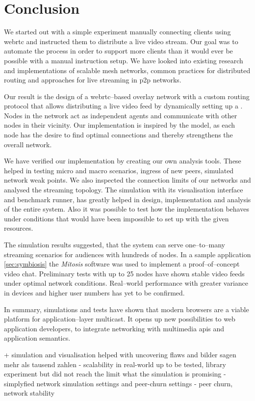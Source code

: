 \section{Conclusion}
We started out with a simple experiment manually connecting clients using \gls{webrtc} and instructed them to distribute a live video stream.
Our goal was to automate the process in order to support more clients than it would ever be possible with a manual instruction setup.
We have looked into existing research and implementations of scalable mesh networks, common practices for distributed routing and approaches for live streaming in \gls{p2p} networks.

Our result is the design of a \gls{webrtc}–based overlay network with a custom routing protocol that allows distributing a live video feed by dynamically setting up a . Nodes in the network act as independent agents and communicate with other nodes in their vicinity. Our implementation is inspired by the  model, as each node has the desire to find optimal connections and thereby strengthens the overall network.

We have verified our implementation by creating our own analysis tools. These helped in testing micro and macro scenarios, ingress of new peers, simulated network weak points. We also inspected the connection limits of our networks and analysed the streaming topology. The simulation with its visualisation interface and benchmark runner, has greatly helped in design, implementation and analysis of the entire system. Also it was possible to test how the implementation behaves under conditions that would have been impossible to set up with the given resources.

The simulation results suggested, that the system can serve one–to–many streaming scenarios for audiences with hundreds of nodes. In a sample application \vref{sec:symbiosis} the \textit{Mitosis} software was used to implement a proof–of–concept video chat. Preliminary tests with up to 25 nodes have shown stable video feeds under optimal network conditions. Real–world performance with greater variance in devices and higher user numbers has yet to be confirmed.


In summary, simulations and tests have shown that modern browsers are a viable platform for application–layer multicast. It opens up new possibilities to web application developers, to integrate networking with multimedia \glspl{api} and application semantics.


+ simulation and visualisation helped with uncovering flaws and bilder sagen mehr als tausend zahlen
- scalability in real-world up to be tested, library experiment but did not reach the limit what the simulation is promising
- simplyfied network simulation settings and peer-churn settings
- peer churn, network stability

